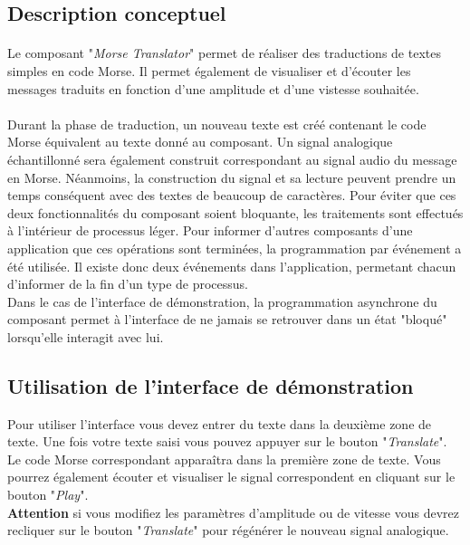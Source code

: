 \documentclass[a4paper,11pt]{article}
\begin{document}
    \subsection{Description conceptuel}
    \paragraph{}
    Le composant "\textit{Morse Translator}" permet de réaliser des traductions de textes simples en code Morse. Il permet également de visualiser et d'écouter les messages traduits en fonction d'une amplitude et d'une vistesse souhaitée.
    \paragraph{}
    Durant la phase de traduction, un nouveau texte est créé contenant le code Morse équivalent au texte donné au composant. Un signal analogique échantillonné sera également construit correspondant au signal audio du message en Morse. Néanmoins, la construction du signal et sa lecture peuvent prendre un temps conséquent avec des textes de beaucoup de caractères. Pour éviter que ces deux fonctionnalités du composant soient bloquante, les traitements sont effectués à l'intérieur de processus léger. Pour informer d'autres composants d'une application que ces opérations sont terminées, la programmation par événement a été utilisée. Il existe donc deux événements dans l'application, permetant chacun d'informer de la fin d'un type de processus.\\
    Dans le cas de l'interface de démonstration, la programmation asynchrone du composant permet à l'interface de ne jamais se retrouver dans un état "bloqué" lorsqu'elle interagit avec lui.


    \subsection{Utilisation de l'interface de démonstration}
    Pour utiliser l'interface vous devez entrer du texte dans la deuxième zone de texte. Une fois votre texte saisi vous pouvez appuyer sur le bouton "\textit{Translate}". Le code Morse correspondant apparaîtra dans la première zone de texte. Vous pourrez également écouter et visualiser le signal correspondent en cliquant sur le bouton "\textit{Play}".\\
    \textbf{Attention} si vous modifiez les paramètres d'amplitude ou de vitesse vous devrez recliquer sur le bouton "\textit{Translate}" pour régénérer le nouveau signal analogique.
\end{document}
